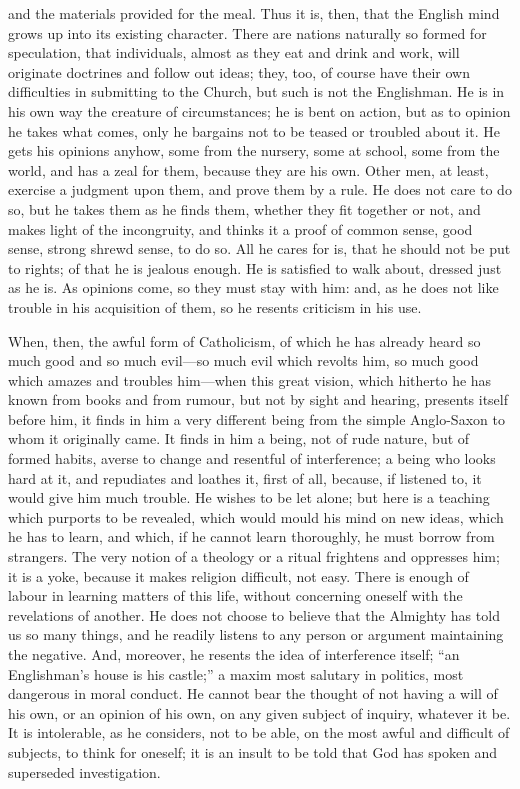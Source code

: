 and the materials provided for the meal. Thus it is,
then, that the English mind grows up into its existing
character. There are nations naturally so formed for
speculation, that individuals, almost as they eat and
drink and work, will originate doctrines and follow out
ideas; they, too, of course have their own difficulties
in submitting to the Church, but such is not the
Englishman. He is in his own way the creature of circumstances; he is bent on action, but as to opinion he
takes what comes, only he bargains not to be teased or
troubled about it. He gets his opinions anyhow, some from
the nursery, some at school, some from the world, and has
a zeal for them, because they are his own. Other men, at
least, exercise a judgment upon them, and prove them by a
rule. He does not care to do so, but he takes them as he
finds them, whether they fit together or not, and makes
light of the incongruity, and thinks it a proof of common
sense, good sense, strong shrewd sense, to do so. All he
cares for is, that he should not be put to rights; of
that he is jealous enough. He is satisfied to walk about,
dressed just as he is. As opinions come, so they must
stay with him: and, as he does not like trouble in his
acquisition of them, so he resents criticism in his use.

When, then, the awful form of Catholicism, of which he
has already heard so much good and so much evil—so
much evil which revolts him, so much good which amazes
and troubles him—when this great vision, which
hitherto he has known from books and from rumour, but not
by sight and hearing, presents itself before him, it
finds in him a very different being from the simple
Anglo-Saxon to whom it originally came. It finds in him a
being, not of rude nature, but of formed habits, averse
to change and resentful of interference; a being who
looks hard at it, and repudiates and loathes it, first of
all, because, if listened to, it would give him much
trouble. He wishes to be let alone; but here is a
teaching which purports to be revealed, which would mould
his mind on new ideas, which he has to learn, and which,
if he cannot learn thoroughly, he must borrow from
strangers. The very notion of a theology or a ritual
frightens and oppresses him; it is a yoke, because it
makes religion difficult, not easy. There is enough of
labour in learning matters of this life, without
concerning oneself with the revelations of another. He
does not choose to believe that the Almighty has told us
so many things, and he readily listens to any person or
argument maintaining the negative. And, moreover, he
resents the idea of interference itself; ``an
Englishman's house is his castle;'' a maxim most
salutary in politics, most dangerous in moral conduct. He
cannot bear the thought of not having a will of his own,
or an opinion of his own, on any given subject of
inquiry, whatever it be. It is intolerable, as he
considers, not to be able, on the most awful and
difficult of subjects, to think for oneself; it is an
insult to be told that God has spoken and superseded
investigation.

